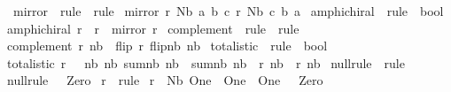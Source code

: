 \begin{isabellebody}
{}
\isamarkuptrue%
%
\endisatagdocument
{\isafolddocument}%
%
\isadelimdocument
%
\endisadelimdocument
{}\isamarkupfalse%
\ mirror\ {\isacharcolon}{\isacharcolon}\ {\isachardoublequoteopen}rule\ {\isasymRightarrow}\ rule{\isachardoublequoteclose}\ \isanewline
{\isachardoublequoteopen}mirror\ r\ {\isacharparenleft}Nb\ a\ b\ c{\isacharparenright}{\isacharequal}\ r\ {\isacharparenleft}Nb\ c\ b\ a{\isacharparenright}{\isachardoublequoteclose}\isanewline
\isanewline
{}\isamarkupfalse%
\ amphichiral\ {\isacharcolon}{\isacharcolon}\ {\isachardoublequoteopen}rule\ {\isasymRightarrow}\ bool{\isachardoublequoteclose}\ \isanewline
{\isachardoublequoteopen}amphichiral\ r\ {\isasymequiv}\ r\ {\isacharequal}\ {\isacharparenleft}mirror\ r{\isacharparenright}{\isachardoublequoteclose}\isanewline
\isanewline
{}\isamarkupfalse%
\ complement\ {\isacharcolon}{\isacharcolon}\ {\isachardoublequoteopen}rule\ {\isasymRightarrow}\ rule{\isachardoublequoteclose}\ \isanewline
{\isachardoublequoteopen}complement\ r\ nb\ {\isacharequal}\ flip\ {\isacharparenleft}r\ {\isacharparenleft}flip{\isacharunderscore}nb\ nb{\isacharparenright}{\isacharparenright}{\isachardoublequoteclose}\isanewline
\isanewline
{}\isamarkupfalse%
\ totalistic\ {\isacharcolon}{\isacharcolon}\ {\isachardoublequoteopen}rule\ {\isasymRightarrow}\ bool{\isachardoublequoteclose}\ \isanewline
{\isachardoublequoteopen}totalistic\ r\ {\isasymequiv}\ {\isacharparenleft}{\isasymforall}\ nb{}\ nb{}{\isachardot}\ sum{\isacharunderscore}nb\ nb{}\ {\isacharequal}\ sum{\isacharunderscore}nb\ nb{}\ {\isasymlongrightarrow}\ {\isacharparenleft}r\ nb{}{\isacharparenright}\ {\isacharequal}\ {\isacharparenleft}r\ nb{}{\isacharparenright}{\isacharparenright}{\isachardoublequoteclose}%
\isadelimdocument
%
\endisadelimdocument
%
\isatagdocument
%
\isamarkuptrue%
%
\endisatagdocument
{\isafolddocument}%
%
\isadelimdocument
%
\endisadelimdocument
{}\isamarkupfalse%
\ null{\isacharunderscore}rule\ {\isacharcolon}{\isacharcolon}\ rule\ \isanewline
{\isachardoublequoteopen}null{\isacharunderscore}rule\ {\isacharunderscore}\ {\isacharequal}\ Zero{\isachardoublequoteclose}\isanewline
\isanewline
{}\isamarkupfalse%
\ r{}{}{}\ {\isacharcolon}{\isacharcolon}\ rule\ \isanewline
{\isachardoublequoteopen}r{}{}{}\ \ {\isacharparenleft}Nb\ One\ \ One\ \ One{\isacharparenright}\ \ {\isacharequal}\ Zero{\isachardoublequoteclose}\ {\isacharbar}\isanewline

\end{isabellebody}
